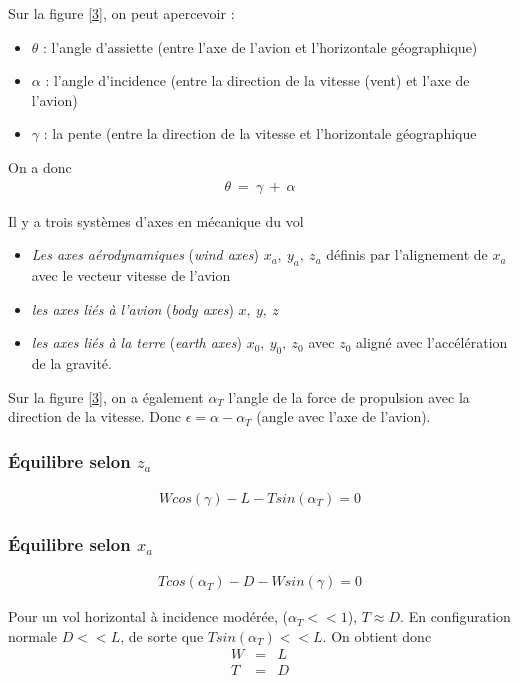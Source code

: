 \documentclass{report}
\begin{document}
Sur la figure \ref{3}, on peut apercevoir :
\begin{itemize}
    \item $\theta$ : l'angle d'assiette (entre l'axe de l'avion et l'horizontale géographique)
    \item $\alpha$ : l'angle d'incidence (entre la direction de la vitesse (vent) et l'axe de l'avion)
    \item $\gamma$ : la pente (entre la direction de la vitesse et l'horizontale géographique
\end{itemize}

On a donc \begin{eqnarray}
\theta ~=~ \gamma~+~\alpha
\end{eqnarray}

Il y a trois systèmes d'axes en mécanique du vol
\begin{itemize}
    \item \textit{Les axes aérodynamiques} (\textit{wind axes}) $x_a,~y_a,~z_a$ définis par l'alignement de $x_a$ avec le vecteur vitesse de l'avion
    \item \textit{les axes liés à l'avion} (\textit{body axes}) $x,~y,~z$
    \item \textit{les axes liés à la terre} (\textit{earth axes}) $x_0,~y_0,~z_0$ avec $z_0$ aligné avec l'accélération de la gravité.
\end{itemize}

Sur la figure \ref{3}, on a également $\alpha_T$ l'angle de la force de propulsion avec la direction de la vitesse. Donc $\epsilon = \alpha-\alpha_T$ (angle avec l'axe de l'avion).

\subsubsection{Équilibre selon $z_a$}

\begin{eqnarray}
W cos(\gamma)-L-Tsin(\alpha_T)=0
\end{eqnarray}

\subsubsection{Équilibre selon $x_a$}
\begin{eqnarray}
Tcos(\alpha_T)-D-W sin(\gamma)=0
\end{eqnarray}

Pour un vol horizontal à incidence modérée, ($\alpha_T<<1$), $T\approx D$. En configuration normale $D<<L$, de sorte que $Tsin(\alpha_T)<<L$. On obtient donc
\begin{eqnarray}
W&=&L\\
T&=&D
\end{eqnarray}
\end{document}
